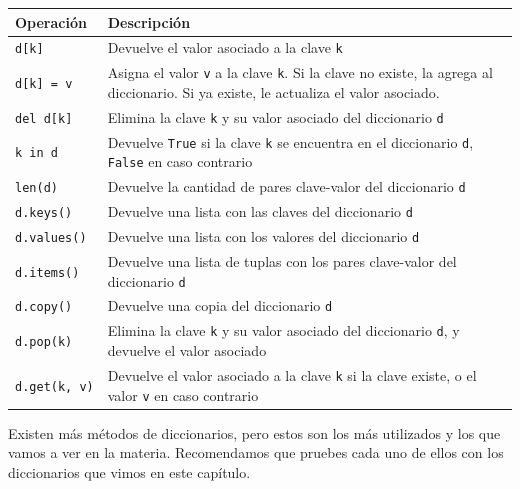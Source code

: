 \documentclass[
  letterpaper,
  DIV=11,
  numbers=noendperiod]{scrreprt}
\begin{document}
\begin{longtable}[]{@{}
  >{\raggedright\arraybackslash}p{}
  >{\raggedright\arraybackslash}p{}@{}}
\toprule\noalign{}
\begin{minipage}[b]{\linewidth}\raggedright
Operación
\end{minipage} & \begin{minipage}[b]{\linewidth}\raggedright
Descripción
\end{minipage} \\
\midrule\noalign{}
\endhead
\bottomrule\noalign{}
\endlastfoot
\texttt{d{[}k{]}} & Devuelve el valor asociado a la clave \texttt{k} \\
\texttt{d{[}k{]}\ =\ v} & Asigna el valor \texttt{v} a la clave
\texttt{k}. Si la clave no existe, la agrega al diccionario. Si ya
existe, le actualiza el valor asociado. \\
\texttt{del\ d{[}k{]}} & Elimina la clave \texttt{k} y su valor asociado
del diccionario \texttt{d} \\
\texttt{k\ in\ d} & Devuelve \texttt{True} si la clave \texttt{k} se
encuentra en el diccionario \texttt{d}, \texttt{False} en caso
contrario \\
\texttt{len(d)} & Devuelve la cantidad de pares clave-valor del
diccionario \texttt{d} \\
\texttt{d.keys()} & Devuelve una lista con las claves del diccionario
\texttt{d} \\
\texttt{d.values()} & Devuelve una lista con los valores del diccionario
\texttt{d} \\
\texttt{d.items()} & Devuelve una lista de tuplas con los pares
clave-valor del diccionario \texttt{d} \\
\texttt{d.copy()} & Devuelve una copia del diccionario \texttt{d} \\
\texttt{d.pop(k)} & Elimina la clave \texttt{k} y su valor asociado del
diccionario \texttt{d}, y devuelve el valor asociado \\
\texttt{d.get(k,\ v)} & Devuelve el valor asociado a la clave \texttt{k}
si la clave existe, o el valor \texttt{v} en caso contrario \\
\end{longtable}

\begin{tcolorbox}[enhanced jigsaw, arc=.35mm, toptitle=1mm, colframe=quarto-callout-note-color-frame, bottomtitle=1mm, opacitybacktitle=0.6, colbacktitle=quarto-callout-note-color!10!white, leftrule=.75mm, coltitle=black, toprule=.15mm, titlerule=0mm, title=\textcolor{quarto-callout-note-color}{\faInfo}\hspace{0.5em}{Note}, bottomrule=.15mm, rightrule=.15mm, colback=white, breakable, opacityback=0, left=2mm]

Existen más métodos de diccionarios, pero estos son los más utilizados y
los que vamos a ver en la materia. Recomendamos que pruebes cada uno de
ellos con los diccionarios que vimos en este capítulo.

\end{tcolorbox}
\end{document}
